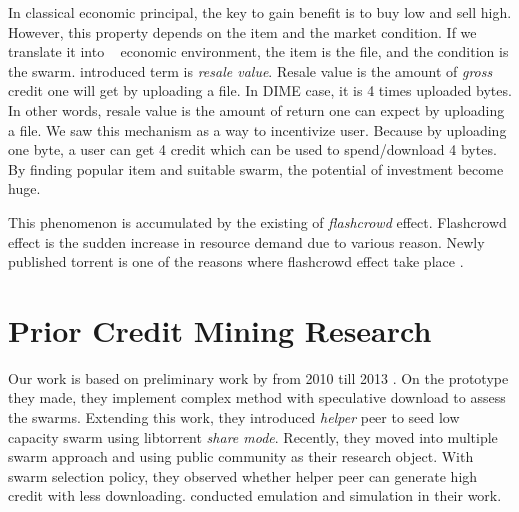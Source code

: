In classical economic principal, the key to gain benefit is to buy low and sell high. However, this property depends on the item and the market condition. If we translate it into \bt~ economic environment, the item is the file, and the condition is the swarm. \citeauthor{2012:economicbt:kash} introduced term is \textit{resale value}. Resale value is the amount of \textit{gross} credit one will get by uploading a file. In DIME case, it is 4 times uploaded bytes. In other words, resale value is the amount of return one can expect by uploading a file. We saw this mechanism as a way to incentivize user. Because by uploading one byte, a user can get 4 credit which can be used to spend/download 4 bytes. By finding popular item and suitable swarm, the potential of investment become huge.

This phenomenon is accumulated by the existing of \textit{flashcrowd} effect. Flashcrowd effect is the sudden increase in resource demand due to various reason. Newly published torrent is one of the reasons where flashcrowd effect take place \cite{2013:swarmevolution:su}. 

%



\section{Prior Credit Mining Research}
\label{section:cmprior}
Our work is based on preliminary work by \citeauthor{2015:creditmining:capota} from 2010 till 2013 \cite{2015:creditmining:capota, 2013:investmentcm:capota, 2014:bwmarket:capota}. On the prototype they made, they implement complex method with speculative download to assess the swarms\cite{2013:investmentcm:capota}. Extending this work, they introduced \textit{helper} peer to seed low capacity swarm using libtorrent \textit{share mode}\cite{2014:bwmarket:capota}. Recently, they moved into multiple swarm approach and using public community as their research object. With swarm selection policy, they observed whether helper peer can generate high credit with less downloading\cite{2015:creditmining:capota}. \citeauthor{2015:creditmining:capota} conducted emulation and simulation in their work.

